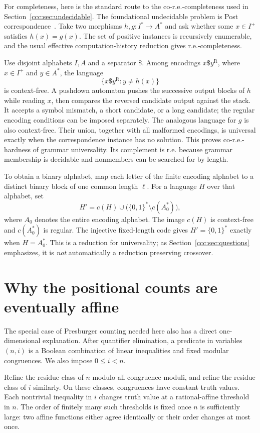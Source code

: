 \documentclass[11pt,letterpaper]{article}
\theoremstyle{definition}
\theoremstyle{remark}
\begin{document}
For completeness, here is the standard route to the co-r.e.-completeness used
in Section~\ref{ccc:sec:undecidable}. The foundational undecidable problem is Post
correspondence~\cite{Post}. Take two morphisms $h,g:I^*\to A^*$ and ask whether
some $x\in I^+$ satisfies $h(x)=g(x)$. The set of positive instances is
recursively enumerable, and the usual effective computation-history reduction
gives r.e.-completeness.

Use disjoint alphabets $I,A$ and a separator $\$$. Among encodings
$x\$y^{\mathrm R}$, where $x\in I^+$ and $y\in A^*$, the language
\[
 \{x\$y^{\mathrm R}:y\ne h(x)\}
\]
is context-free. A pushdown automaton pushes the successive output blocks of
$h$ while reading $x$, then compares the reversed candidate output against the
stack. It accepts a symbol mismatch, a short candidate, or a long candidate;
the regular encoding conditions can be imposed separately. The analogous
language for $g$ is also context-free. Their union, together with all malformed
encodings, is universal exactly when the correspondence instance has no
solution. This proves co-r.e.-hardness of grammar universality. Its complement
is r.e. because grammar membership is decidable and nonmembers can be searched
for by length.

To obtain a binary alphabet, map each letter of the finite encoding alphabet
to a distinct binary block of one common length $\ell$. For a language $H$
over that alphabet, set
\[
 H'=c(H)\cup\bigl(\{0,1\}^*\setminus c(A_0^*)\bigr),
\]
where $A_0$ denotes the entire encoding alphabet. The image $c(H)$ is
context-free and $c(A_0^*)$ is regular. The injective fixed-length code gives
$H'=\{0,1\}^*$ exactly when $H=A_0^*$. This is a reduction for universality;
as Section~\ref{ccc:sec:questions} emphasizes, it is \emph{not} automatically a
reduction preserving crossover.

\section{Why the positional counts are eventually affine}
\label{ccc:app:counting}

The special case of Presburger counting needed here also has a direct
one-dimensional explanation. After quantifier elimination, a predicate in
variables $(n,i)$ is a Boolean combination of linear inequalities and fixed
modular congruences. We also impose $0\leq i<n$.

Refine the residue class of $n$ modulo all congruence moduli, and refine the
residue class of $i$ similarly. On these classes, congruences have constant
truth values. Each nontrivial inequality in $i$ changes truth value at a
rational-affine threshold in $n$. The order of finitely many such thresholds
is fixed once $n$ is sufficiently large: two affine functions either agree
identically or their order changes at most once.
\end{document}
